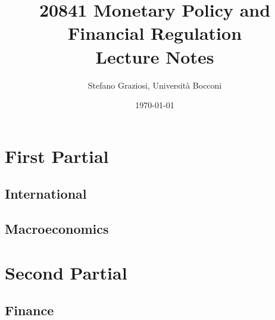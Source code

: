 \documentclass[usenames,dvipsnames,12pt]{book}
\title{20841 Monetary Policy and Financial Regulation \\[1cm] \textbf{Lecture Notes}}
\author{Stefano Graziosi, Università Bocconi}
\date{\today}
\begin{document}
\maketitle

\tableofcontents

\part{First Partial}

    \chapter{International}

    \chapter{Macroeconomics}

\part{Second Partial}

    \chapter{Finance}
\end{document}
